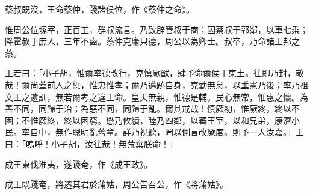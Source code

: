 
\begin{pinyinscope}
蔡叔既沒，王命蔡仲，踐諸侯位，作《蔡仲之命》。

惟周公位塚宰，正百工，群叔流言。乃致辟管叔于商；囚蔡叔于郭鄰，以車七乘；降霍叔于庶人，三年不齒。蔡仲克庸只德，周公以為卿士。叔卒，乃命諸王邦之蔡。

王若曰：「小子胡，惟爾率德改行，克慎厥猷，肆予命爾侯于東土。往即乃封，敬哉！爾尚蓋前人之愆，惟忠惟孝；爾乃邁跡自身，克勤無怠，以垂憲乃後；率乃祖文王之遺訓，無若爾考之違王命。皇天無親，惟德是輔。民心無常，惟惠之懷。為善不同，同歸于治；為惡不同，同歸于亂。爾其戒哉！慎厥初，惟厥終，終以不困；不惟厥終，終以困窮。懋乃攸績，睦乃四鄰，以蕃王室，以和兄弟，康濟小民。率自中，無作聰明亂舊章。詳乃視聽，罔以側言改厥度。則予一人汝嘉。」王曰：「嗚呼！小子胡，汝往哉！無荒棄朕命！」

成王東伐淮夷，遂踐奄，作《成王政》。

成王既踐奄，將遷其君於蒲姑，周公告召公，作《將蒲姑》。


\end{pinyinscope}